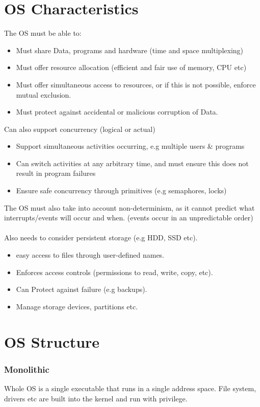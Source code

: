 \documentclass{report}
\begin{document}
\section*{OS Characteristics}
The OS must be able to:
\begin{itemize}
	\item Must share Data, programs and hardware (time and space multiplexing)
	\item Must offer resource allocation (efficient and fair use of memory, CPU etc)
	\item Must offer simultaneous access to resources, or if this is not possible, enforce mutual exclusion.
	\item Must protect against accidental or malicious corruption of Data.
\end{itemize}
Can also support concurrency (logical or actual)
\begin{itemize}
	\item Support simultaneous activities occurring, e.g multiple users \& programs
	\item Can switch activities at any arbitrary time, and must ensure this does not result in program failures
	\item Ensure safe concurrency through primitives (e.g semaphores, locks)
\end{itemize}
The OS must also take into account non-determinism, as it cannot predict what interrupts/events will occur and when. (events occur in an unpredictable order)
\\
\\ Also needs to consider persistent storage (e.g HDD, SSD etc).
\begin{itemize}
	\item easy access to files through user-defined names.
	\item Enforces access controls (permissions to read, write, copy, etc).
	\item Can Protect against failure (e.g backups).
	\item Manage storage devices, partitions etc.
\end{itemize}
\section*{OS Structure}
\subsubsection*{Monolithic}
Whole OS is a single executable that runs in a single address space. File system, drivers etc are built into the kernel and run with privilege.
\end{document}
